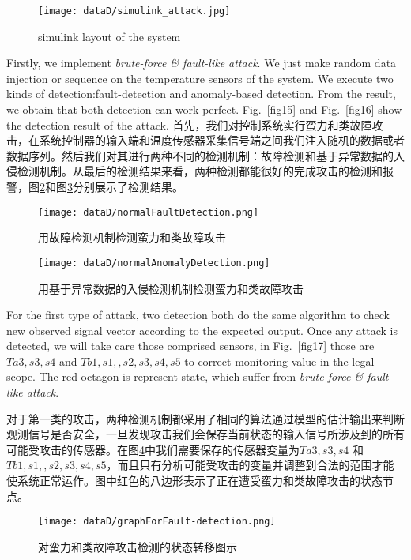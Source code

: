 	\begin{figure}[!htb]
		\centering
		\texttt{[image: dataD/simulink\_attack.jpg]}
		\caption{simulink layout of the system}
		\label{fig114}
	\end{figure}
	
	Firstly, we implement \textit{brute-force \& fault-like attack}. We just make random data injection or sequence on the temperature sensors of the system. We execute two kinds of detection:fault-detection and anomaly-based detection. From the result, we obtain that both detection can work perfect. Fig.~\ref{fig15} and Fig.~\ref{fig16} show the detection result of the attack.
	首先，我们对控制系统实行蛮力和类故障攻击，在系统控制器的输入端和温度传感器采集信号端之间我们注入随机的数据或者数据序列。然后我们对其进行两种不同的检测机制：故障检测和基于异常数据的入侵检测机制。从最后的检测结果来看，两种检测都能很好的完成攻击的检测和报警，图\ref{fig115}和图\ref{fig116}分别展示了检测结果。
	
	\begin{figure}[!htb]
		\centering
		\texttt{[image: dataD/normalFaultDetection.png]}
		\caption{用故障检测机制检测蛮力和类故障攻击}
		\label{fig115}
	\end{figure}
	
	\begin{figure}[!htb]
		\centering
		\texttt{[image: dataD/normalAnomalyDetection.png]}
		\caption{用基于异常数据的入侵检测机制检测蛮力和类故障攻击}
		\label{fig116}
	\end{figure}
	
	For the first type of attack, two detection both do the same algorithm to check new observed signal vector according to the expected output. Once any attack is detected, we will take care those comprised sensors, in 
	Fig.~\ref{fig17} those are $Ta3,s3,s4$ and $Tb1,s1,,s2,s3,s4,s5$ to correct monitoring value in the legal scope. The red octagon is represent state, which suffer from \textit{brute-force \& fault-like attack}.
	
	对于第一类的攻击，两种检测机制都采用了相同的算法通过模型的估计输出来判断观测信号是否安全，一旦发现攻击我们会保存当前状态的输入信号所涉及到的所有可能受攻击的传感器。在图\ref{fig117}中我们需要保存的传感器变量为$Ta3,s3,s4$ 和 $Tb1,s1,,s2,s3,s4,s5$，而且只有分析可能受攻击的变量并调整到合法的范围才能使系统正常运作。图中红色的八边形表示了正在遭受蛮力和类故障攻击的状态节点。
	\begin{figure}[!htb]
		\centering
		\texttt{[image: dataD/graphForFault-detection.png]}
		\caption{对蛮力和类故障攻击检测的状态转移图示}
		\label{fig117}
	\end{figure}
	
